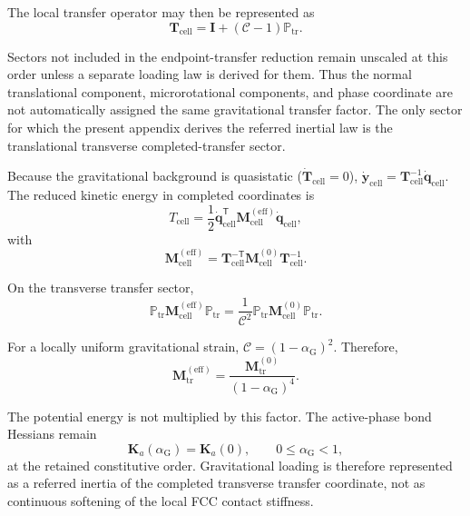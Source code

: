 The local transfer operator may then be represented as
\begin{equation}
    \mathbf T_{\mathrm{cell}}
    =
    \mathbf I
    +
    (\mathcal C-1)\mathbb P_{\mathrm{tr}}.
\end{equation}

Sectors not included in the endpoint-transfer reduction remain unscaled at this order unless a separate loading law is derived for them. Thus the normal translational component, microrotational components, and phase coordinate are not automatically assigned the same gravitational transfer factor. The only sector for which the present appendix derives the referred inertial law is the translational transverse completed-transfer sector.

Because the gravitational background is quasistatic ($\dot{\mathbf{T}}_{\mathrm{cell}}=0$), $\dot{\mathbf{y}}_{\mathrm{cell}} = \mathbf{T}_{\mathrm{cell}}^{-1} \dot{\mathbf{q}}_{\mathrm{cell}}$. The reduced kinetic energy in completed coordinates is
\begin{equation}
    T_{\mathrm{cell}} = \frac{1}{2} \dot{\mathbf{q}}_{\mathrm{cell}}^{\mathsf{T}} \mathbf{M}_{\mathrm{cell}}^{(\mathrm{eff})} \dot{\mathbf{q}}_{\mathrm{cell}},
\end{equation}
with
\begin{equation}
    \mathbf{M}_{\mathrm{cell}}^{(\mathrm{eff})} = \mathbf{T}_{\mathrm{cell}}^{-\mathsf{T}} \mathbf{M}_{\mathrm{cell}}^{(0)} \mathbf{T}_{\mathrm{cell}}^{-1}.
\end{equation}

On the transverse transfer sector,
\begin{equation}
    \mathbb{P}_{\mathrm{tr}} \mathbf{M}_{\mathrm{cell}}^{(\mathrm{eff})} \mathbb{P}_{\mathrm{tr}} = \frac{1}{\mathcal{C}^2} \mathbb{P}_{\mathrm{tr}} \mathbf{M}_{\mathrm{cell}}^{(0)} \mathbb{P}_{\mathrm{tr}}.
\end{equation}

For a locally uniform gravitational strain, $\mathcal{C}=(1-\alpha_{\mathrm{G}})^2$. Therefore,
\begin{equation}
    \mathbf{M}_{\mathrm{tr}}^{(\mathrm{eff})} = \frac{\mathbf{M}_{\mathrm{tr}}^{(0)}}{(1-\alpha_{\mathrm{G}})^4}.
\end{equation}

The potential energy is not multiplied by this factor. The active-phase bond Hessians remain
\begin{equation}
    \mathbf{K}_a(\alpha_{\mathrm{G}}) = \mathbf{K}_a(0), \qquad 0 \leq \alpha_{\mathrm{G}} < 1,
\end{equation}
at the retained constitutive order. Gravitational loading is therefore represented as a referred inertia of the completed transverse transfer coordinate, not as continuous softening of the local FCC contact stiffness.

